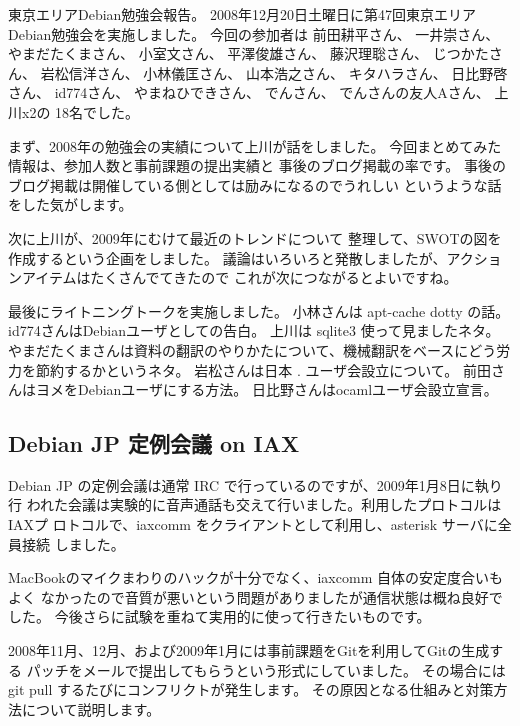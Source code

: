 \documentclass[mingoth,a4paper]{jsarticle}
\begin{document}
東京エリアDebian勉強会報告。
2008年12月20日土曜日に第47回東京エリアDebian勉強会を実施しました。
今回の参加者は
前田耕平さん、
一井崇さん、
やまだたくまさん、
小室文さん、
平澤俊雄さん、
藤沢理聡さん、
じつかたさん、
岩松信洋さん、
小林儀匡さん、
山本浩之さん、
キタハラさん、
日比野啓さん、
id774さん、
やまねひできさん、
でんさん、
でんさんの友人Aさん、
上川x2の
18名でした。

まず、2008年の勉強会の実績について上川が話をしました。
今回まとめてみた情報は、参加人数と事前課題の提出実績と
事後のブログ掲載の率です。
事後のブログ掲載は開催している側としては励みになるのでうれしい
というような話をした気がします。


次に上川が、2009年にむけて最近のトレンドについて
整理して、SWOTの図を作成するという企画をしました。
議論はいろいろと発散しましたが、アクションアイテムはたくさんでてきたので
これが次につながるとよいですね。


最後にライトニングトークを実施しました。
小林さんは apt-cache dotty の話。
id774さんはDebianユーザとしての告白。
上川は sqlite3 使って見ましたネタ。
やまだたくまさんは資料の翻訳のやりかたについて、機械翻訳をベースにどう労力を節約するかというネタ。
岩松さんは日本 . ユーザ会設立について。
前田さんはヨメをDebianユーザにする方法。
日比野さんはocamlユーザ会設立宣言。

\subsection{Debian JP 定例会議 on IAX}

Debian JP の定例会議は通常 IRC で行っているのですが、2009年1月8日に執り行
われた会議は実験的に音声通話も交えて行いました。利用したプロトコルはIAXプ
ロトコルで、iaxcomm をクライアントとして利用し、asterisk サーバに全員接続
しました。

MacBookのマイクまわりのハックが十分でなく、iaxcomm 自体の安定度合いもよく
なかったので音質が悪いという問題がありましたが通信状態は概ね良好でした。
今後さらに試験を重ねて実用的に使って行きたいものです。



2008年11月、12月、および2009年1月には事前課題をGitを利用してGitの生成する
パッチをメールで提出してもらうという形式にしていました。
その場合には git pull するたびにコンフリクトが発生します。
その原因となる仕組みと対策方法について説明します。
\end{document}
